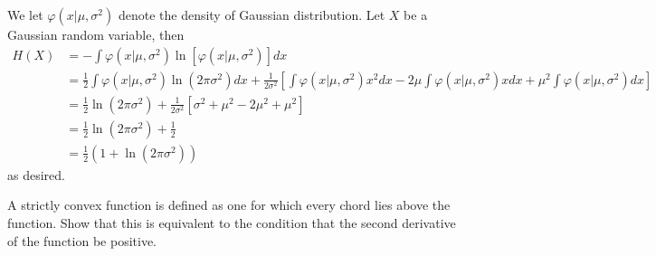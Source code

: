 We let $\varphi(x\vert\mu,\sigma^{2})$ denote the density of Gaussian
distribution. Let $X$ be a Gaussian random variable, then 
\begin{align*}
H(X) & =-\int\varphi(x\vert\mu,\sigma^{2})\ln\left[\varphi(x\vert\mu,\sigma^{2})\right]dx\\
 & =\frac{1}{2}\int\varphi(x\vert\mu,\sigma^{2})\ln(2\pi\sigma^{2})dx+\frac{1}{2\sigma^{2}}\left[\int\varphi(x\vert\mu,\sigma^{2})x^{2}dx-2\mu\int\varphi(x\vert\mu,\sigma^{2})xdx+\mu^{2}\int\varphi(x\vert\mu,\sigma^{2})dx\right]\\
 & =\frac{1}{2}\ln(2\pi\sigma^{2})+\frac{1}{2\sigma^{2}}\left[\sigma^{2}+\mu^{2}-2\mu^{2}+\mu^{2}\right]\\
 & =\frac{1}{2}\ln(2\pi\sigma^{2})+\frac{1}{2}\\
 & =\frac{1}{2}(1+\ln(2\pi\sigma^{2}))
\end{align*}
as desired.\\

\begin{cBoxA}{}
 A strictly convex function is defined as one for which every chord
lies above the function. Show that this is equivalent to the condition
that the second derivative of the function be positive.
\end{cBoxA}

